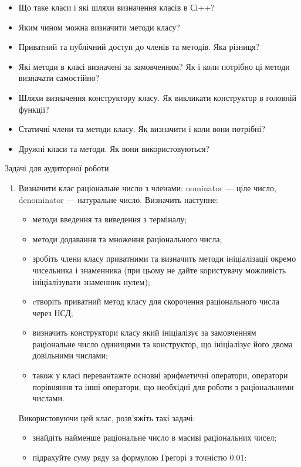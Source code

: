\documentclass[]{article}
\makeatletter
\newcommand{\xslalph}[1]{\expandafter\@xslalph\csname c@#1\endcsname}
\newcommand{\@xslalph}[1]{%
    \ifcase#1\or а\or б\or в\or г\or д\or e\or є\or ж\or з\or i%
    \or й\or к\or л\or м\or н\or о\or п\or р\or с\or т%
    \or у\or ф\or х\or ц\or ч\or ш\or ю\or я\or аа\or бб\or вв%
    \else\@ctrerr\fi%
}
\makeatother
\begin{document}
\begin{enumerate}
\begin{enumerate}[label=\xslalph*)]
\begin{enumerate}
\begin{enumerate}[label=\xslalph*)]
\begin{itemize}
\item
Що таке класи і які шляхи визначення класів в Сі++?
\item
Яким чином можна визначити методи класу?
\item
Приватний та публічний доступ до членів та методів. Яка різниця?
\item
Які методи в класі визначені за замовченням? Як і коли потрібно ці
методи визначати самостійно?
\item 
Шляхи визначення конструктору класу. Як викликати конструктор в
головній функції?
\item
Статичні члени та методи класу. Як визначити і коли вони потрібні?
\item 
Дружні класи та методи. Як вони використовуються?
\end{itemize}

Задачі для аудиторної роботи
\begin{enumerate}
\def\labelenumi{\arabic{enumi})}

\item 

Визначити клас раціональне число з членами: nominator --- ціле
число, denominator --- натуральне число. Визначить наступне:
\begin{itemize}
\item
методи введення та виведення з терміналу;
\item 
методи додавання та множення раціонального числа;
\item
зробіть члени класу приватними та визначить методи ініціалізації
окремо чисельника і знаменника (при цьому не дайте користувачу
можливість ініціалізувати знаменник нулем);
\item
cтворіть приватний метод класу для скорочення раціонального числа
через НСД;
\item визначить конструктори класу який ініціалізує за замовченням
раціональне число одиницями та конструктор, що ініціалізує його двома
довільними числами;
\item також у класі перевантажте основні арифметичні оператори, оператори
порівняння та інші оператори, що необхідні для роботи з раціональними
числами.
\end{itemize}

Використовуючи цей клас, розв'яжіть такі задачі:
\begin{itemize}
\item
знайдіть найменше раціональне число в масиві раціональних чисел;
\item
підрахуйте суму ряду за формулою Грегорі з точністю 0.01:


\end{itemize}
\end{enumerate}
\end{enumerate}
\end{enumerate}
\end{enumerate}
\end{enumerate}
\end{document}
